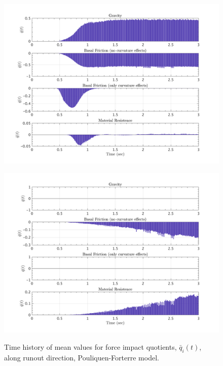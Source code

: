 \documentclass{article}
\begin{document}
\begin{figure}[H]
        \begin{minipage}[b]{0.5\linewidth}
                \centering
                \includegraphics[width=1\textwidth]{InclinedPlane/LocalRecords/ContribF15_P_x.png}
                \label{fig:Ramp-Px3}
        \end{minipage}
        \begin{minipage}[b]{0.5\linewidth}
                \centering
                \includegraphics[width=1\textwidth]{InclinedPlane/LocalRecords/ContribF17_P_x.png}
                \label{fig:Ramp-Px4}
        \end{minipage}
        \caption{Time history of mean values for force impact quotients, $\bar{q}_i(t)$, along runout direction, Pouliquen-Forterre model.}
        \label{fig:Ramp-Px}
\end{figure}
\end{document}

